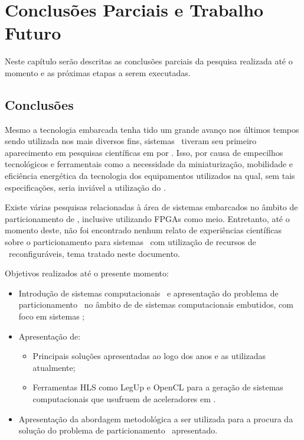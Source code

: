 
\chapter{Conclusões Parciais e Trabalho Futuro} \label{chap:conclusao}

   Neste capítulo serão descritas as conclusões parciais da pesquisa realizada até o momento e as próximas etapas a serem executadas.   

   \section{Conclusões}
      Mesmo a tecnologia embarcada tenha tido um grande avanço nos últimos tempos sendo utilizada nos mais diversos fins, sistemas \wearables\ tiveram seu primeiro aparecimento em pesquisas científicas em \citeyear{Mann1996} por \citeauthor{Mann1996}.
      Isso, por causa de empecilhos tecnológicos e ferramentais como a necessidade da miniaturização, mobilidade e eficiência energética da tecnologia dos equipamentos utilizados na qual, sem tais especificações, seria inviável a utilização do \wearable.
      
      Existe várias pesquisas relacionadas à área de sistemas embarcados no âmbito de particionamento de \hs, inclusive utilizando FPGAs como meio.
      Entretanto, até o momento deste, não foi encontrado nenhum relato de experiências científicas sobre o particionamento para sistemas \wearables\ com utilização de recursos de \hardwares\ reconfiguráveis, tema tratado neste documento.
      
      Objetivos realizados até o presente momento:
      
      \begin{itemize}
         \item Introdução de sistemas computacionais \wearables\ e apresentação do problema de particionamento \hs\ no âmbito de de sistemas computacionais embutidos, com foco em sistemas \wearables;
         
         \item Apresentação de:
         \begin{itemize}
            \item Principais soluções apresentadas ao logo dos anos e as utilizadas atualmente;
            \item Ferramentas HLS como LegUp e OpenCL para a geração de sistemas computacionais que usufruem de aceleradores em \hardware.
         \end{itemize}
         
         \item Apresentação da abordagem metodológica a ser utilizada para a procura da solução do problema de particionamento \hs\ apresentado.
      \end{itemize}
      
